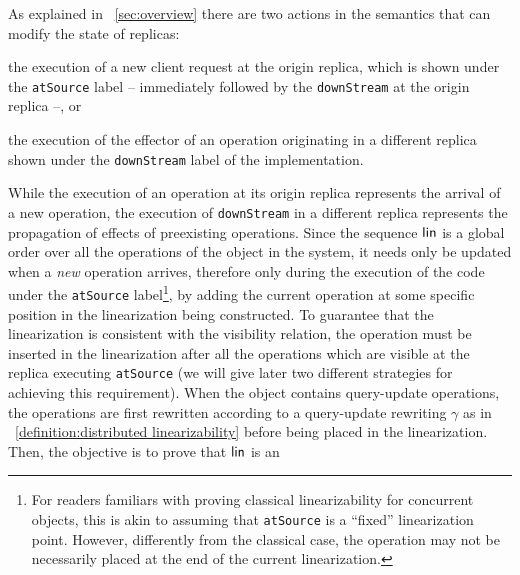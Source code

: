 As explained in \sectionautorefname~\ref{sec:overview} there are two actions in the
semantics that can modify the state of replicas:
\begin{inparaenum}
\item the execution of a new client request at the origin replica,
  which is shown under the \lstinline|atSource| label -- immediately
  followed by the \lstinline|downStream| at the origin replica
  --, or
\item the execution of the effector of an operation originating in a
  different replica shown under the \lstinline|downStream| label of
  the implementation.
\end{inparaenum}
%
While the execution of an operation at its origin replica represents
the arrival of a new operation, the execution of 
\lstinline|downStream| in a different replica represents the
propagation of effects of preexisting operations.
%
Since the sequence $\mathsf{lin}$ is a global order over all the
operations of the object in the system, it needs only be updated when
a \emph{new} operation arrives, therefore only during the execution of the code under the
\lstinline|atSource| label\footnote{For readers familiars with proving classical
  linearizability for concurrent objects, this is akin to assuming that
  \lstinline|atSource| is a ``fixed'' linearization point.
  However, differently from the classical case, the operation may not
  be necessarily placed at the end of the current linearization.},
by adding the current operation at some specific position in the
linearization being constructed.
%
%
To guarantee that the linearization is consistent with the visibility
relation, the operation must be inserted in the linearization after
all the operations which are visible at the replica executing
\lstinline|atSource| (we will give later two different strategies for achieving this requirement).
When the object contains query-update operations, the operations are
first rewritten according to a query-update rewriting $\gamma$ as in
~\ref{definition:distributed linearizability} before being placed
in the linearization.
Then, the objective is to prove that $\mathsf{lin}$ is an
